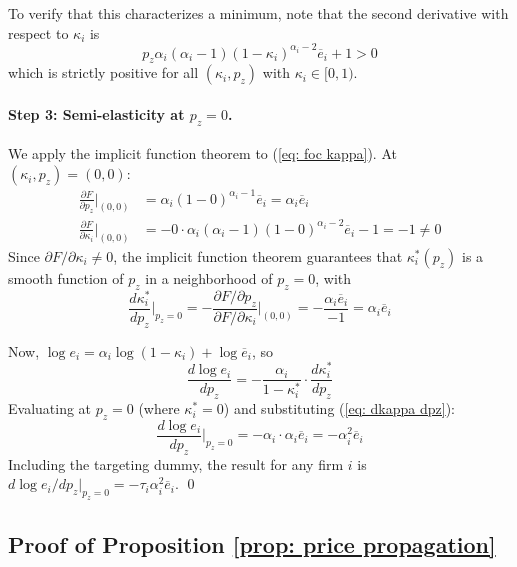 To verify that this characterizes a minimum, note that the second derivative with respect to $\kappa_i$ is
\begin{equation*}
    p_z \alpha_i (\alpha_i - 1)(1-\kappa_i)^{\alpha_i - 2}\overline{e}_i + 1 > 0
\end{equation*}
which is strictly positive for all $(\kappa_i, p_z)$ with $\kappa_i \in [0,1)$.

\paragraph{Step 3: Semi-elasticity at $p_z = 0$.} We apply the implicit function theorem to (\ref{eq: foc kappa}). At $(\kappa_i, p_z) = (0, 0)$:
\begin{align*}
    \frac{\partial F}{\partial p_z}\bigg|_{(0,0)} &= \alpha_i (1 - 0)^{\alpha_i - 1} \overline{e}_i = \alpha_i \overline{e}_i \\
    \frac{\partial F}{\partial \kappa_i}\bigg|_{(0,0)} &= -0 \cdot \alpha_i(\alpha_i - 1)(1-0)^{\alpha_i - 2}\overline{e}_i - 1 = -1 \neq 0
\end{align*}
Since $\partial F / \partial \kappa_i \neq 0$, the implicit function theorem guarantees that $\kappa_i^*(p_z)$ is a smooth function of $p_z$ in a neighborhood of $p_z = 0$, with
\begin{equation}
    \label{eq: dkappa dpz}
    \frac{d\kappa_i^*}{dp_z}\bigg|_{p_z = 0} = -\frac{\partial F / \partial p_z}{\partial F / \partial \kappa_i}\bigg|_{(0,0)} = -\frac{\alpha_i \overline{e}_i}{-1} = \alpha_i \overline{e}_i
\end{equation}

Now, $\log e_i = \alpha_i \log(1 - \kappa_i) + \log \overline{e}_i$, so
\begin{equation*}
    \frac{d \log e_i}{d p_z} = -\frac{\alpha_i}{1 - \kappa_i^*} \cdot \frac{d\kappa_i^*}{dp_z}
\end{equation*}
Evaluating at $p_z = 0$ (where $\kappa_i^* = 0$) and substituting (\ref{eq: dkappa dpz}):
\begin{equation*}
    \frac{d \log e_i}{d p_z}\bigg|_{p_z = 0} = -\alpha_i \cdot \alpha_i \overline{e}_i = -\alpha_i^2 \overline{e}_i
\end{equation*}
Including the targeting dummy, the result for any firm $i$ is $d \log e_i / dp_z|_{p_z=0} = -\tau_i \alpha_i^2 \overline{e}_i$. \qed

\subsection{Proof of Proposition \ref{prop: price propagation}}

